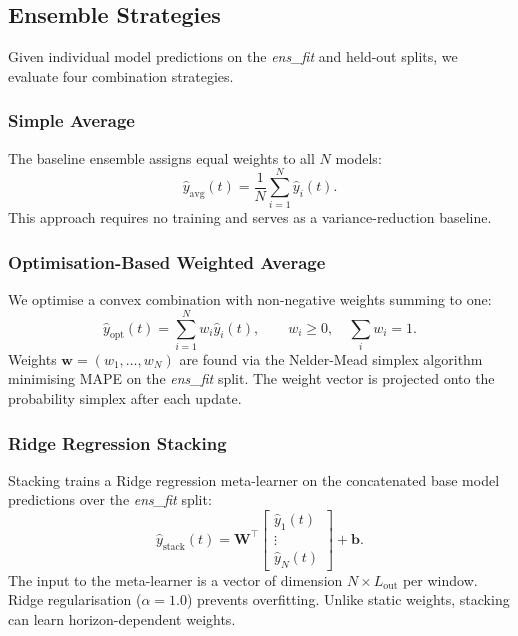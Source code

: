 \documentclass[11pt,a4paper]{article}
\begin{document}
\subsection{Ensemble Strategies}

Given individual model predictions on the \textit{ens\_fit} and held-out
splits, we evaluate four combination strategies.

\subsubsection{Simple Average}
The baseline ensemble assigns equal weights to all $N$ models:
\begin{equation}
  \hat{y}_{\mathrm{avg}}(t) = \frac{1}{N} \sum_{i=1}^{N} \hat{y}_{i}(t).
\end{equation}
This approach requires no training and serves as a variance-reduction baseline.

\subsubsection{Optimisation-Based Weighted Average}
We optimise a convex combination with non-negative weights summing to one:
\begin{equation}
  \hat{y}_{\mathrm{opt}}(t) = \sum_{i=1}^{N} w_i \hat{y}_{i}(t),
  \qquad w_i \geq 0,\quad \sum_{i} w_i = 1.
\end{equation}
Weights $\mathbf{w}=(w_1,\ldots,w_N)$ are found via the Nelder-Mead simplex
algorithm \cite{nelder1965} minimising MAPE on the \textit{ens\_fit} split.
The weight vector is projected onto the probability simplex after each update.

\subsubsection{Ridge Regression Stacking}
Stacking trains a Ridge regression meta-learner on the concatenated base model
predictions over the \textit{ens\_fit} split:
\begin{equation}
  \hat{y}_{\mathrm{stack}}(t)
    = \mathbf{W}^{\!\top}
      \begin{bmatrix} \hat{y}_1(t) \\ \vdots \\ \hat{y}_N(t) \end{bmatrix}
    + \mathbf{b}.
\end{equation}
The input to the meta-learner is a vector of dimension $N \times L_{\mathrm{out}}$
per window.  Ridge regularisation ($\alpha=1.0$) prevents overfitting.  Unlike
static weights, stacking can learn horizon-dependent weights.
\end{document}

